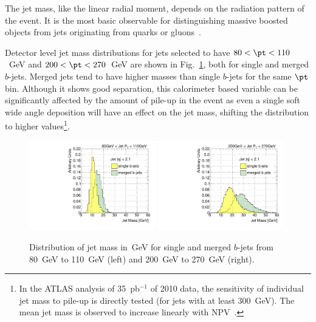 The jet mass, like the linear radial moment, depends on the radiation pattern of the event. It is the most basic observable for distinguishing massive boosted objects from jets originating from quarks or gluons~\cite{PhysRevD.79.074012}. %


Detector level jet mass distributions for jets selected to have $80 < \pt < 110$~GeV and $200 < \pt < 270$~GeV are shown in Fig.~\ref{fig:masssinglemerged}, both for single and merged $b$-jets. Merged jets tend to have higher masses than single $b$-jets for the same $\pt$ bin.  
Although it shows good separation, this calorimeter based variable %
can be significantly affected by the amount of pile-up in the event as even a single soft wide angle deposition will have an effect on the jet mass, shifting the distribution to higher values\footnote{In the ATLAS analysis of 35~pb$^{-1}$ of 2010 data, the sensitivity of individual jet mass to pile-up is directly tested (for jets with at least 300~GeV). The mean jet mass is observed to increase linearly with NPV~\cite{ATLAS-CONF-2011-073}.}. %




\begin{figure}[tp]
\centering
\includegraphics[width=0.49\textwidth]{FIGS/VarsSingleMerged/JetMass080.pdf}
\includegraphics[width=0.49\textwidth]{FIGS/VarsSingleMerged/JetMass200.pdf}
\caption{Distribution of jet mass in~GeV for single and merged $b$-jets from 80~GeV to 110~GeV (left) and 200~GeV to 270~GeV (right).}
\label{fig:masssinglemerged}
\end{figure}


